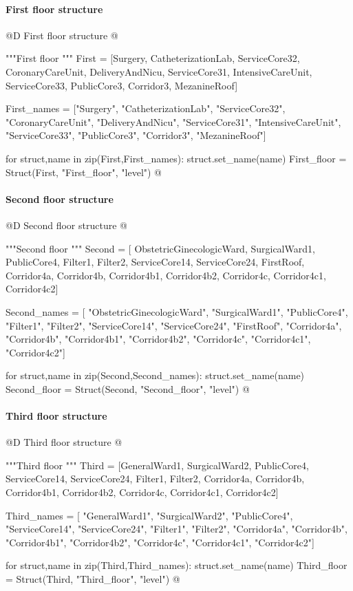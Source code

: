 \documentclass[11pt,oneside]{article}    %
\begin{document}
\paragraph{First floor structure}
@D First floor structure
@{"""First floor """
First = [Surgery, CatheterizationLab,
    ServiceCore32,  CoronaryCareUnit, DeliveryAndNicu, ServiceCore31,
    IntensiveCareUnit, ServiceCore33, PublicCore3, Corridor3, MezanineRoof]

First_names = ["Surgery", "CatheterizationLab",
    "ServiceCore32", "CoronaryCareUnit", "DeliveryAndNicu", "ServiceCore31",
    "IntensiveCareUnit", "ServiceCore33", "PublicCore3", "Corridor3", "MezanineRoof"]

for struct,name in zip(First,First_names): struct.set_name(name)
First_floor = Struct(First, "First_floor", "level")
@}

\paragraph{Second floor structure}
@D Second floor structure
@{"""Second floor """
Second = [ ObstetricGinecologicWard, SurgicalWard1,
    PublicCore4, Filter1, Filter2,
    ServiceCore14, ServiceCore24, FirstRoof,  Corridor4a, Corridor4b,
    Corridor4b1, Corridor4b2, Corridor4c, Corridor4c1, Corridor4c2]

Second_names = [ "ObstetricGinecologicWard", "SurgicalWard1",
    "PublicCore4", "Filter1", "Filter2",
    "ServiceCore14", "ServiceCore24", "FirstRoof", "Corridor4a", "Corridor4b",
    "Corridor4b1", "Corridor4b2", "Corridor4c", "Corridor4c1", "Corridor4c2"]

for struct,name in zip(Second,Second_names): struct.set_name(name)
Second_floor = Struct(Second, "Second_floor", "level")
@}

\paragraph{Third floor structure}
@D Third floor structure
@{"""Third floor """
Third = [GeneralWard1, SurgicalWard2, PublicCore4, ServiceCore14, ServiceCore24,
    Filter1, Filter2, Corridor4a, Corridor4b, Corridor4b1, Corridor4b2, Corridor4c,
    Corridor4c1, Corridor4c2]

Third_names = [ "GeneralWard1", "SurgicalWard2", "PublicCore4", "ServiceCore14", 
	"ServiceCore24", "Filter1", "Filter2", "Corridor4a", "Corridor4b", "Corridor4b1", 
	"Corridor4b2", "Corridor4c", "Corridor4c1", "Corridor4c2"]

for struct,name in zip(Third,Third_names): struct.set_name(name)
Third_floor = Struct(Third, "Third_floor", "level")
@}
\end{document}
